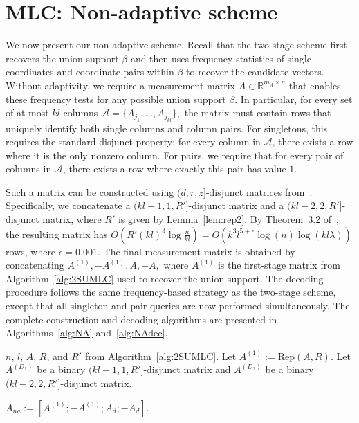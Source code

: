 \documentclass[10pt,a4paper]{amsart}
\begin{document}
\section{MLC: Non-adaptive scheme}\label{sec:1SMLC}
We now present our non-adaptive scheme. Recall that the two-stage scheme first recovers the union support $\beta$ and then uses frequency statistics of single coordinates and coordinate pairs within $\beta$ to recover the candidate vectors. Without adaptivity, we require a measurement matrix $A\in\mathbb{R}^{m_A\times n}$ that enables these frequency tests for any possible union support $\beta$. In particular, for every set of at most $kl$ columns
\(
\mathcal A=\{A_{j_1},\ldots,A_{j_{kl}}\},
\)
the matrix must contain rows that uniquely identify both single columns and column pairs. For singletons, this requires the standard disjunct property: for every column in $\mathcal A$, there exists a row where it is the only nonzero column. For pairs, we require that for every pair of columns in $\mathcal A$, there exists a row where exactly this pair has value $1$.

Such a matrix can be constructed using $(d,r,z]$-disjunct matrices from~\cite{chen2008upper}. Specifically, we concatenate a $(kl-1,1,R']$-disjunct matrix and a $(kl-2,2,R']$-disjunct matrix, where $R'$ is given by Lemma~\ref{lem:rep2}. By Theorem~3.2 of~\cite{chen2008upper}, the resulting matrix has
\(
O\!\left(R'(kl)^3\log\frac{n}{kl}\right)
=
O\!\left(k^3l^{5+\epsilon}\log(n)\log(kl\lambda)\right)
\)
rows, where $\epsilon=0.001$. The final measurement matrix is obtained by concatenating
\(
A^{(1)},-A^{(1)},A,-A,
\)
where $A^{(1)}$ is the first-stage matrix from Algorithm~\ref{alg:2SUMLC} used to recover the union support. The decoding procedure follows the same frequency-based strategy as the two-stage scheme, except that all singleton and pair queries are now performed simultaneously. The complete construction and decoding algorithms are presented in Algorithms~\ref{alg:NA} and~\ref{alg:NAdec}.


\begin{algorithm}
\caption{Non-adaptive scheme of the MLC under Assumption~\ref{Assumption1}: Measurement matrix}\label{alg:NA}
\begin{algorithmic}[1]
    \Require $n$, $l$, $A$, $R$, and $R'$ from Algorithm~\ref{alg:2SUMLC}.
    \State Let $A^{(1)}:=\mathrm{Rep}(A,R)$. Let $A^{(D_1)}$ be a binary $(kl-1,1,R']$-disjunct matrix \cite{chen2008upper} and $A^{(D_2)}$ be a binary $(kl-2,2,R']$-disjunct matrix.
    
    \State \Return $A_{na}:=[A^{(1)};-A^{(1)};A_d;-A_d]$.

\end{algorithmic}
\end{algorithm}
\end{document}
